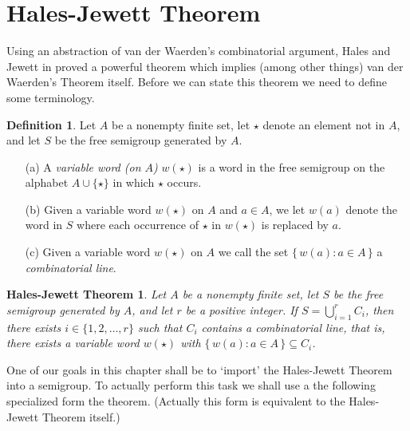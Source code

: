 \documentclass[12pt]{article}
\theoremstyle{plain}
\newtheorem{hj}[thm]{Hales-Jewett Theorem}
\theoremstyle{definition}
\newtheorem{defn}[thm]{Definition}
\begin{document}
\section{Hales-Jewett Theorem}
Using an abstraction of van der Waerden's combinatorial argument, Hales and Jewett in \cite{Hales:1963fk} proved a powerful theorem which implies (among other things) van der Waerden's Theorem itself.
Before we can state this theorem we need to define some terminology.

\begin{defn}
  Let $A$ be a nonempty finite set, let $\star$ denote an element not in $A$, and let $S$ be the free semigroup generated by $A$.
  \begin{itemize}
    \item[(a)] A \textsl{variable word (on $A$)} $w(\star)$ is a word in the  free semigroup on the alphabet $A \cup \{\star\}$ in which $\star$ occurs.

    \item[(b)] Given a variable word $w(\star)$ on $A$ and $a \in A$, we let $w(a)$ denote the word in $S$ where each occurrence of $\star$ in $w(\star)$ is replaced by $a$.

    \item[(c)] Given a variable word $w(\star)$ on $A$ we call the set $\{\, w(a) : a \in A \,\}$ a \textsl{combinatorial line}.
  \end{itemize}
\end{defn}

\begin{hj}
  Let $A$ be a nonempty finite set, let $S$ be the free semigroup generated by $A$, and let $r$ be a positive integer.
  If $S = \bigcup_{i=1}^r C_i$, then there exists $i \in \{1, 2, \ldots, r\}$ such that $C_i$ contains a combinatorial line, that is, there exists a variable word $w(\star)$ with $\bigl\{\, w(a) : a \in A \,\bigr\} \subseteq C_i$.
\end{hj}

One of our goals in this chapter shall be to `import' the Hales-Jewett Theorem into a semigroup. 
To actually perform this task we shall use a the following specialized form the theorem.  
(Actually this form is equivalent to the Hales-Jewett Theorem itself.)
\end{document}
